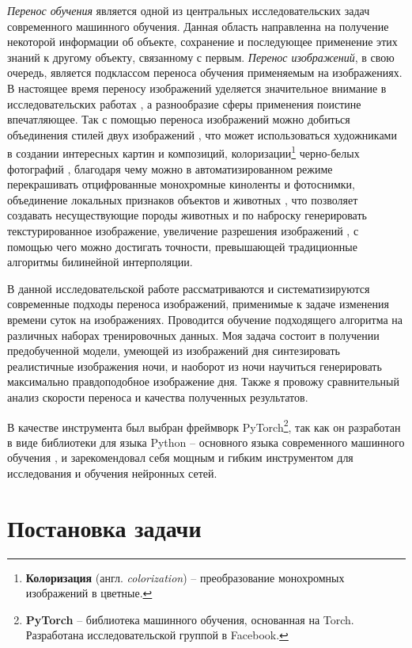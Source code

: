 \documentclass[11pt,a4paper]{extarticle}
\begin{document}
	\textit{Перенос обучения} является одной из центральных исследовательских задач современного машинного обучения.
	Данная область направленна на получение некоторой информации об объекте, сохранение и последующее применение этих знаний к другому объекту, связанному с первым.   
	\textit{Перенос изображений}, в свою очередь, является подклассом переноса обучения применяемым на изображениях. 
	В настоящее время переносу изображений уделяется значительное внимание в исследовательских работах \cite{i2ipapers}, а разнообразие сферы применения поистине впечатляющее.
	Так с помощью переноса изображений можно добиться объединения стилей двух изображений \cite{style_transfer}, что может использоваться художниками в создании интересных картин и композиций,
	колоризации\footnote{ \textbf{Колоризация} (англ. \textit{colorization}) -- преобразование монохромных изображений в цветные.} черно-белых фотографий \cite{color_transfer},
	благодаря чему можно в автоматизированном режиме перекрашивать отцифрованные монохромные киноленты и фотоснимки,
	объединение локальных признаков объектов и животных \cite{CycleGAN}, что позволяет создавать несуществующие породы животных и по наброску генерировать текстурированное изображение,
	увеличение разрешения изображений \cite{super_resolution}, с помощью чего можно достигать точности, превышающей традиционные алгоритмы билинейной интерполяции.

	В данной исследовательской работе рассматриваются и систематизируются современные подходы переноса изображений, применимые к задаче изменения времени суток на изображениях.
	Проводится обучение подходящего алгоритма на различных наборах тренировочных данных.
	Моя задача состоит в получении предобученной модели, умеющей из изображений дня синтезировать реалистичные изображения ночи,
	и наоборот из ночи научиться генерировать максимально правдоподобное изображение дня. 
	Также я провожу сравнительный анализ скорости переноса и качества полученных результатов.
	
	В качестве инструмента был выбран фреймворк PyTorch\footnote{
		\textbf{PyTorch} -- библиотека машинного обучения, основанная на Torch. Разработана исследовательской группой в Facebook.
	}, так как он разработан в виде библиотеки для языка Python -- основного языка современного машинного обучения \cite{ml_lang},
	и зарекомендовал себя мощным и гибким инструментом для исследования и обучения нейронных сетей.

\newpage
\section{Постановка задачи}
\end{document}
